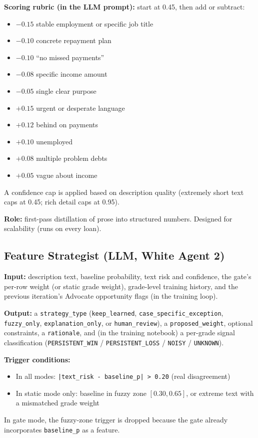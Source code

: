 \documentclass[11pt,a4paper]{article}
\begin{document}
\noindent
\textbf{Scoring rubric (in the LLM prompt):} start at 0.45, then add or
subtract:
\begin{itemize}[itemsep=0pt]
    \item $-0.15$ stable employment or specific job title
    \item $-0.10$ concrete repayment plan
    \item $-0.10$ ``no missed payments''
    \item $-0.08$ specific income amount
    \item $-0.05$ single clear purpose
    \item $+0.15$ urgent or desperate language
    \item $+0.12$ behind on payments
    \item $+0.10$ unemployed
    \item $+0.08$ multiple problem debts
    \item $+0.05$ vague about income
\end{itemize}
\noindent
A confidence cap is applied based on description quality (extremely short
text caps at 0.45; rich detail caps at 0.95).

\noindent
\textbf{Role:} first-pass distillation of prose into structured numbers.
Designed for scalability (runs on every loan).

\subsection{Feature Strategist (LLM, White Agent 2)}

\noindent
\textbf{Input:} description text, baseline probability, text risk and
confidence, the gate's per-row weight (or static grade weight),
grade-level training history, and the previous iteration's Advocate
opportunity flags (in the training loop).

\noindent
\textbf{Output:} a \texttt{strategy\_type} (\texttt{keep\_learned},
\texttt{case\_specific\_exception}, \texttt{fuzzy\_only},
\texttt{explanation\_only}, or \texttt{human\_review}), a
\texttt{proposed\_weight}, optional constraints, a \texttt{rationale},
and (in the training notebook) a per-grade signal classification
(\texttt{PERSISTENT\_WIN} / \texttt{PERSISTENT\_LOSS} / \texttt{NOISY} /
\texttt{UNKNOWN}).

\noindent
\textbf{Trigger conditions:}
\begin{itemize}[itemsep=0pt]
    \item In all modes: \texttt{|text\_risk - baseline\_p| > 0.20} (real disagreement)
    \item In static mode only: baseline in fuzzy zone $[0.30, 0.65]$, or extreme text
          with a mismatched grade weight
\end{itemize}
\noindent
In gate mode, the fuzzy-zone trigger is dropped because the gate already
incorporates \texttt{baseline\_p} as a feature.
\end{document}
